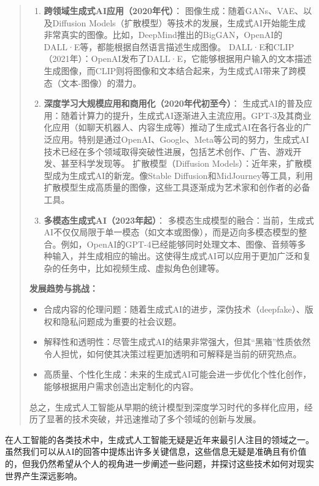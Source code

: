 \begin{quote}
\begin{enumerate}
  \item \textbf{跨领域生成式AI应用（2020年代）}：
  图像生成：随着GANs、VAE、以及Diffusion Models（扩散模型）等技术的发展，生成式AI开始能生成非常真实的图像。比如，DeepMind推出的BigGAN，OpenAI的DALL·E等，都能根据自然语言描述生成图像。
  DALL·E和CLIP（2021年）：OpenAI发布了DALL·E，它能够根据用户输入的文本描述生成图像，而CLIP则将图像和文本结合起来，为生成式AI带来了跨模态（文本-图像）的潜力。

  \item \textbf{深度学习大规模应用和商用化（2020年代初至今）}：
  生成式AI的普及应用：随着计算力的提升，生成式AI逐渐进入主流应用。GPT-3及其商业化应用（如聊天机器人、内容生成等）推动了生成式AI在各行各业的广泛应用。特别是通过OpenAI、Google、Meta等公司的努力，生成式AI技术已经在多个领域取得突破性进展，包括艺术创作、广告、游戏开发、甚至科学发现等。
  扩散模型（Diffusion Models）：近年来，扩散模型成为生成式AI的新宠。像Stable Diffusion和MidJourney等工具，利用扩散模型生成高质量的图像，这些工具逐渐成为艺术家和创作者的必备工具。

  \item \textbf{多模态生成式AI（2023年起）}：
  多模态生成模型的融合：当前，生成式AI不仅仅局限于单一模态（如文本或图像），而是迈向多模态模型的整合。例如，OpenAI的GPT-4已经能够同时处理文本、图像、音频等多种输入，并生成相应的输出。这使得生成式AI可以应用于更加广泛和复杂的任务中，比如视频生成、虚拟角色创建等。
  
\end{enumerate}

\textbf{发展趋势与挑战：}

\begin{itemize}
  \item 合成内容的伦理问题：随着生成式AI的进步，深伪技术（deepfake）、版权和隐私问题成为重要的社会议题。
  \item 解释性和透明性：尽管生成式AI的结果非常强大，但其“黑箱”性质依然令人担忧，如何使其决策过程更加透明和可解释是当前的研究热点。
  \item 高质量、个性化生成：未来的生成式AI可能会进一步优化个性化创作，能够根据用户需求创造出定制化的内容。
\end{itemize}

总之，生成式人工智能从早期的统计模型到深度学习时代的多样化应用，经历了显著的技术突破，并迅速推动了多个领域的创新与发展。
\end{quote}

在人工智能的各类技术中，生成式人工智能无疑是近年来最引人注目的领域之一。虽然我们可以从AI的回答中提炼出许多关键信息，这些信息无疑是准确且有价值的，但我仍然希望从个人的视角进一步阐述一些问题，并探讨这些技术如何对现实世界产生深远影响。

